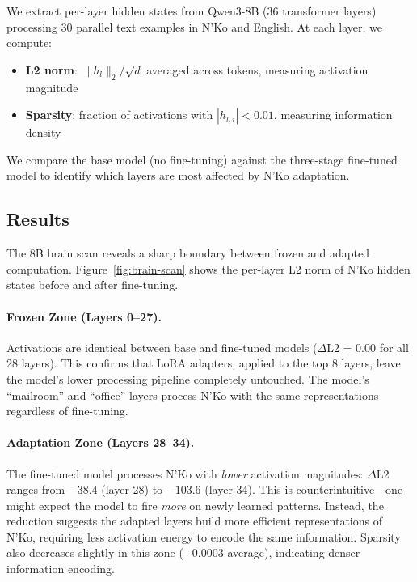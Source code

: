 \documentclass[11pt]{article}
\begin{document}
We extract per-layer hidden states from Qwen3-8B (36 transformer layers) processing 30 parallel text examples in N'Ko and English.
At each layer, we compute:

\begin{itemize}
\item \textbf{L2 norm}: $\|h_l\|_2 / \sqrt{d}$ averaged across tokens, measuring activation magnitude
\item \textbf{Sparsity}: fraction of activations with $|h_{l,i}| < 0.01$, measuring information density
\end{itemize}

We compare the base model (no fine-tuning) against the three-stage fine-tuned model to identify which layers are most affected by N'Ko adaptation.

\subsection{Results}

The 8B brain scan reveals a sharp boundary between frozen and adapted computation.
Figure~\ref{fig:brain-scan} shows the per-layer L2 norm of N'Ko hidden states before and after fine-tuning.

\paragraph{Frozen Zone (Layers 0--27).}
Activations are identical between base and fine-tuned models ($\Delta$L2 = 0.00 for all 28 layers).
This confirms that LoRA adapters, applied to the top 8 layers, leave the model's lower processing pipeline completely untouched.
The model's ``mailroom'' and ``office'' layers process N'Ko with the same representations regardless of fine-tuning.

\paragraph{Adaptation Zone (Layers 28--34).}
The fine-tuned model processes N'Ko with \textit{lower} activation magnitudes: $\Delta$L2 ranges from $-38.4$ (layer 28) to $-103.6$ (layer 34).
This is counterintuitive---one might expect the model to fire \textit{more} on newly learned patterns.
Instead, the reduction suggests the adapted layers build more efficient representations of N'Ko, requiring less activation energy to encode the same information.
Sparsity also decreases slightly in this zone ($-0.0003$ average), indicating denser information encoding.
\end{document}

